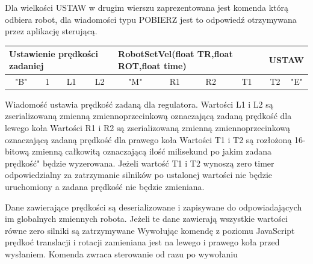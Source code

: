 \documentclass[eng,printmode]{mgr}
\begin{document}
Dla wielkości USTAW w drugim wierszu zaprezentowana jest komenda którą odbiera robot, dla wiadomości typu POBIERZ jest to odpowiedź otrzymywana przez aplikację sterującą.

\begin{table}[!htb]
\centering
\begin{adjustbox}{width=1\textwidth}
\label{my-label}
\begin{tabular}{|c|c|c|c|c|c|c|c|c|c|}
\hline
\multicolumn{4}{|l|}{Ustawienie prędkości zadaniej} & \multicolumn{4}{l|}{RobotSetVel(float TR,float ROT,float time)} & \multicolumn{2}{l|}{USTAW} \\ \hline
"B" \hspace{1em}             & 1\hspace{2em}              & L1\hspace{2em}              & L2\hspace{2em}         & "M"\hspace{2em}         & R1\hspace{2em}         & R2\hspace{2em}         & T1\hspace{2em}         & T2\hspace{2em}          & "E"\hspace{2em}          \\ \hline
\end{tabular}
\end{adjustbox}
\end{table}
Wiadomość ustawia prędkość zadaną dla regulatora. 
Wartości L1 i L2 są zserializowaną zmienną zmiennoprzecinkową oznaczającą zadaną prędkość dla lewego koła
Wartości R1 i R2 są zserializowaną zmienną zmiennoprzecinkową oznaczającą zadaną prędkość dla prawego koła 
Wartości T1 i T2 są rozłożoną 16-bitową zmienną całkowitą oznaczającą ilość milisekund po jakim zadana prędkość" będzie wyzerowana. 
Jeżeli wartość T1 i T2 wynoszą zero timer odpowiedzialny za zatrzymanie silników po ustalonej wartości nie będzie uruchomiony a zadana prędkość nie będzie zmieniana.

Dane zawierające prędkości są deserializowane i zapisywane do odpowiadających im globalnych zmiennych robota. Jeżeli te dane zawierają wszystkie wartości równe zero silniki są zatrzymywane
Wywołując komendę z poziomu JavaScript prędkoć translacji i rotacji zamieniana jest na lewego i prawego koła przed wysłaniem.
Komenda zwraca sterowanie od razu po wywołaniu
\end{document}
